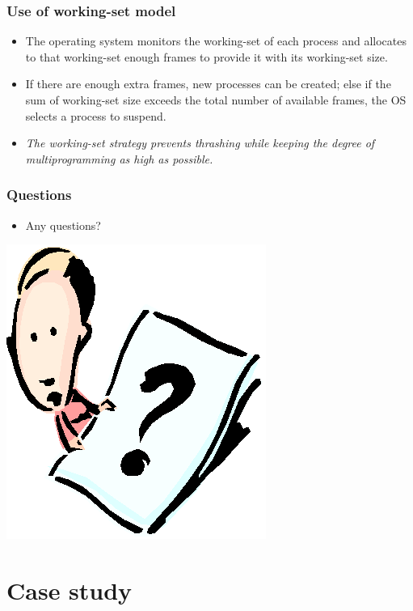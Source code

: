 \documentclass[CJKutf8,xcolor=pdftex,dvipsnames,table]{beamer}
\begin{document}
\begin{CJK*}{UTF8}{song}
  \begin{frame}
    \frametitle{Use of working-set model} \pause
    \begin{itemize}
    \item{The operating system monitors the working-set of each process and allocates to that working-set enough frames to provide it with its working-set size.} \pause
    \item{If there are enough extra frames, new processes can be created; else if the sum of working-set size exceeds the total number of available frames, the OS selects a process to suspend.} \pause
    \item{\emph{The working-set strategy prevents thrashing while keeping the degree of multiprogramming as high as possible.}}
    \end{itemize}
  \end{frame}
  
  \begin{frame}
    \frametitle{Questions}
    \begin{itemize}
    \item{Any questions?}
    \end{itemize}
    \begin{center}
      \includegraphics[scale=.5]{question}
    \end{center}
  \end{frame}
  
  \section{Case study}


\end{CJK*}
\end{document}
